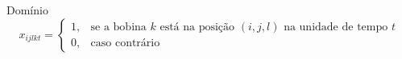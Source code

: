 \begin{frame}{Domínio}
    \[
    x_{ijlkt} =
    \begin{cases}
        1, & \text{se a bobina $k$ est\'a na posi\c{c}\~ao $(i, j, l)$ na unidade de tempo $t$} \\
        0, & \text{caso contr\'ario}
    \end{cases}
    \]
\end{frame}


